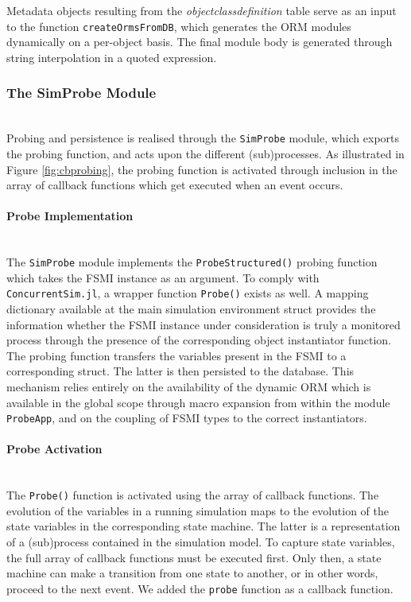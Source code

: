 \documentclass{juliacon}
\begin{document}
Metadata objects resulting from the \textit{objectclassdefinition} table serve as an input to the function \texttt{createOrmsFromDB}, which generates the ORM modules dynamically on a per-object basis. The final module body is generated through string interpolation in a quoted expression.

\subsubsection{The SimProbe Module}\hfill\\

Probing and persistence is realised through the \texttt{SimProbe} module, which exports the probing function, and acts upon the different (sub)processes. As illustrated in Figure \ref{fig:cbprobing}, the probing function is activated through inclusion in the array of callback functions which get executed when an event occurs. \vskip 6pt

\paragraph{Probe Implementation}\hfill\\

The \texttt{SimProbe} module implements the \texttt{ProbeStructured()} probing function which takes the FSMI instance as an argument. To comply with \texttt{ConcurrentSim.jl}, a wrapper function \texttt{Probe()} exists as well. A mapping dictionary available at the main simulation environment struct provides the information whether the FSMI instance under consideration is truly a monitored process through the presence of the corresponding object instantiator function. The probing function transfers the variables present in the FSMI to a corresponding struct. The latter is then persisted to the database. This mechanism relies entirely on the availability of the dynamic ORM which is available in the global scope through macro expansion from within the module \texttt{ProbeApp}, and on the coupling of FSMI types to the correct instantiators.\vskip 6pt

\paragraph{Probe Activation}\hfill\\

The \texttt{Probe()} function is activated using the array of callback functions. The evolution of the variables in a running simulation maps to the evolution of the state variables in the corresponding state machine. The latter is a representation of a (sub)process contained in the simulation model. To capture state variables, the full array of callback functions must be executed first. Only then, a state machine can make a transition from one state to another, or in other words, proceed to the next event. We added the \texttt{probe} function as a callback function.\vskip 6pt
\end{document}
